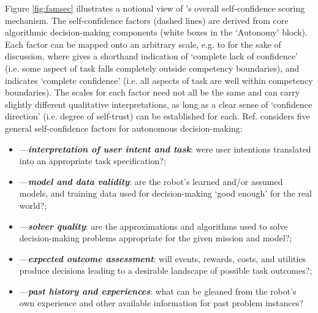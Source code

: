 Figure \ref{fig:famsec} illustrates a notional view of \famsec's overall self-confidence scoring mechanism. The self-confidence factors (dashed lines) are derived from core algorithmic decision-making components (white boxes in the `Autonomy' block).  
Each factor \xind{} can be mapped onto an arbitrary scale, e.g. \flow{} to \fup{} for the sake of discussion, where \flow{} gives a shorthand indication of `complete lack of confidence' (i.e. some aspect of task falls completely outside competency boundaries), and \fup{} indicates `complete confidence' (i.e. all aspects of task are well within competency boundaries). 
The scales for each factor need not all be the same and can carry slightly different qualitative interpretations, as long as a clear sense of `confidence direction' (i.e. degree of self-trust) can be established for each. Ref. \cite{Aitken2016-cv} considers five general self-confidence factors for autonomous decision-making: %
\begin{itemize}
    \item \xI---\textit{\textbf{interpretation of user intent and task}}: were user intentions translated into an appropriate task specification?; 
    \item \xM---\textit{\textbf{model and data validity}}: are the robot's learned and/or assumed models, and training data used for decision-making `good enough' for the real world?; 
    \item \xQ---\textit{\textbf{solver quality}}: are the approximations and algorithms used to solve decision-making problems appropriate for the given mission and model?; 
    \item \xO---\textit{\textbf{expected outcome assessment}}: will events, rewards, costs, and utilities produce decisions leading to a desirable landscape of possible task outcomes?; 
    \item \xP---\textit{\textbf{past history and experiences}}: what can be gleaned from the robot's own experience and other available information for past problem instances? %
\end{itemize}

